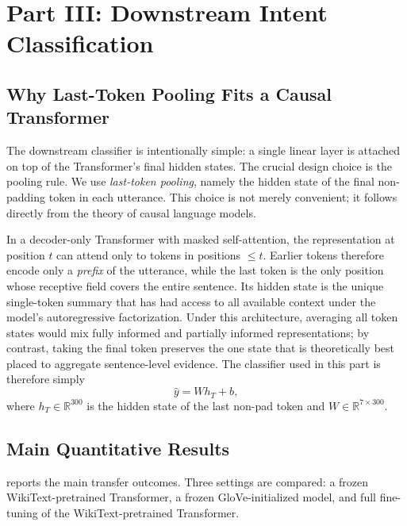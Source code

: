 \documentclass[10pt,a4paper]{article}
\begin{document}
\section{Part III: Downstream Intent Classification}
\label{sec:part3}

\subsection{Why Last-Token Pooling Fits a Causal Transformer}
\label{sec:last_token}

The downstream classifier is intentionally simple: a single linear layer is attached on top of the Transformer's final hidden states. The crucial design choice is the pooling rule. We use \emph{last-token pooling}, namely the hidden state of the final non-padding token in each utterance. This choice is not merely convenient; it follows directly from the theory of causal language models.

In a decoder-only Transformer with masked self-attention, the representation at position $t$ can attend only to tokens in positions $\leq t$. Earlier tokens therefore encode only a \emph{prefix} of the utterance, while the last token is the only position whose receptive field covers the entire sentence. Its hidden state is the unique single-token summary that has had access to all available context under the model's autoregressive factorization. Under this architecture, averaging all token states would mix fully informed and partially informed representations; by contrast, taking the final token preserves the one state that is theoretically best placed to aggregate sentence-level evidence. The classifier used in this part is therefore simply
\[
\hat{y} = W h_T + b,
\]
where $h_T \in \mathbb{R}^{300}$ is the hidden state of the last non-pad token and $W \in \mathbb{R}^{7 \times 300}$.

\subsection{Main Quantitative Results}
\label{sec:part3_results}

 reports the main transfer outcomes. Three settings are compared: a frozen WikiText-pretrained Transformer, a frozen GloVe-initialized model, and full fine-tuning of the WikiText-pretrained Transformer.
\end{document}
